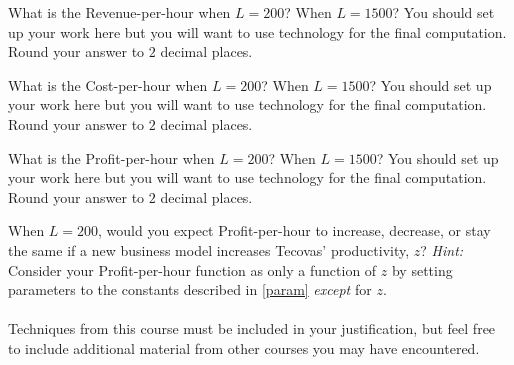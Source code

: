 \documentclass[11pt]{article}
\begin{document}
{{
\item What is the Revenue-per-hour when $L=200$?  When $L=1500$? You should set up your work here but you will want to use technology for the final computation. Round your answer to $2$ decimal places.
\vfill
\newpage
\item What is the Cost-per-hour when $L=200$?  When $L=1500$? You should set up your work here but you will want to use technology for the final computation. Round your answer to $2$ decimal places.
\item What is the Profit-per-hour when $L=200$?  When $L=1500$? You should set up your work here but you will want to use technology for the final computation. Round your answer to $2$ decimal places.
}
\vfill
\newpage
\item When $L=200$, would you expect Profit-per-hour to increase, decrease, or stay the same if a new business model increases Tecovas' productivity, $z$?  {\em Hint:} Consider your Profit-per-hour function as only a function of $z$ by setting parameters to the constants described in \eqref{param} {\em except} for $z$. \\\\Techniques from this course must be included in your justification, but feel free to include additional material from other courses you may have encountered. 

}
\end{document}

